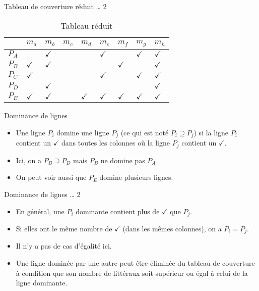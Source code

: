 \documentclass[presentation]{beamer}
\begin{document}
\begin{frame}[label={sec:org319fa53}]{Tableau de couverture réduit \ldots{} 2}
\begin{table}[htbp]
\caption{\label{tab:org30cd09d}Tableau réduit}
\centering
\begin{tabular}{lllllllll}
 & \(m_a\) & \(m_b\) & \(m_c\) & \(m_d\) & \(m_e\) & \(m_f\) & \(m_g\) & \(m_h\)\\[0pt]
\hline
\(P_A\) &  & \(\checkmark\) &  &  & \(\checkmark\) &  & \(\checkmark\) & \(\checkmark\)\\[0pt]
\(P_B\) & \(\checkmark\) & \(\checkmark\) &  &  &  & \(\checkmark\) &  & \(\checkmark\)\\[0pt]
\(P_C\) & \(\checkmark\) &  &  &  & \(\checkmark\) &  & \(\checkmark\) & \(\checkmark\)\\[0pt]
\(P_D\) &  & \(\checkmark\) &  &  &  &  &  & \(\checkmark\)\\[0pt]
\(P_E\) & \(\checkmark\) & \(\checkmark\) &  & \(\checkmark\) & \(\checkmark\) & \(\checkmark\) & \(\checkmark\) & \(\checkmark\)\\[0pt]
\end{tabular}
\end{table}
\end{frame}


\begin{frame}[label={sec:orgc6f4b8b}]{Dominance de lignes}
\begin{itemize}
\item Une ligne \(P_i\) domine une ligne \(P_j\) (ce qui est noté \(P_i \supseteq P_j\)) si la ligne \(P_i\) contient un \(\checkmark\) dans toutes les colonnes où la ligne \(P_j\) contient un \(\checkmark\).

\item Ici, on a \(P_B \supseteq P_D\) mais \(P_B\) ne domine pas \(P_A\).

\item On peut voir aussi que \(P_E\) domine plusieurs lignes.
\end{itemize}
\end{frame}

\begin{frame}[label={sec:org53ebb06}]{Dominance de lignes \ldots{} 2}
\begin{itemize}
\item En général, une \(P_i\) dominante contient plus de \(\checkmark\) que \(P_j\).

\item Si elles ont le même nombre de \(\checkmark\) (dans les mêmes colonnes), on a \(P_i = P_j\).

\item Il n'y a pas de cas d'égalité ici.

\item Une ligne \alert{dominée} par une autre peut être éliminée du tableau de couverture à condition que son nombre de littéraux soit supérieur ou égal à celui de la ligne dominante.
\end{itemize}
\end{frame}
\end{document}
